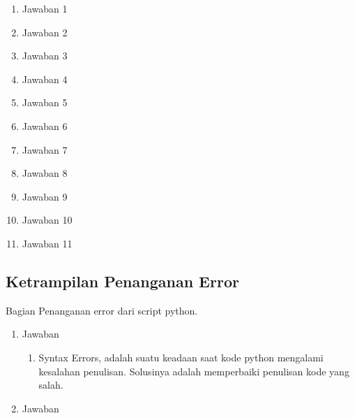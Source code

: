 \begin{enumerate}
\begin{itemize}
\begin{enumerate}

\item Jawaban 1


\item Jawaban 2


\item Jawaban 3


\item Jawaban 4


\item Jawaban 5


\item Jawaban 6


\item Jawaban 7


\item Jawaban 8


\item Jawaban 9


\item Jawaban 10


\item Jawaban 11


\end{enumerate}

\subsection{Ketrampilan Penanganan Error}
Bagian Penanganan error dari script python.
\begin{enumerate}
\item Jawaban
\begin{enumerate}
\item Syntax Errors, adalah suatu keadaan saat kode python mengalami kesalahan penulisan. Solusinya adalah memperbaiki penulisan kode yang salah.

\end{enumerate}
\item Jawaban																	

\end{enumerate}
\end{itemize}
\end{enumerate}


